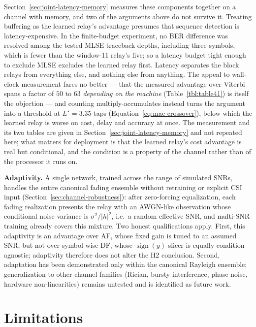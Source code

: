 Section~\ref{sec:joint-latency-memory} measures these components together on a channel with memory, and two of the arguments above do not survive it. Treating buffering as the learned relay's advantage presumes that sequence detection is latency-expensive. In the finite-budget experiment, no BER difference was resolved among the tested MLSE traceback depths, including three symbols, which is fewer than the window-11 relay's five; so a latency budget tight enough to exclude MLSE excludes the learned relay first. Latency separates the block relays from everything else, and nothing else from anything. The appeal to wall-clock measurement fares no better --- that the measured advantage over Viterbi spans a factor of $50$ to $63$ \emph{depending on the machine} (Table~\ref{tbl:table41}) is itself the objection --- and counting multiply-accumulates instead turns the argument into a threshold at $L^{\star}=3.35$ taps (Equation~\ref{eq:mac-crossover}), below which the learned relay is worse on cost, delay and accuracy at once. The measurement and its two tables are given in Section~\ref{sec:joint-latency-memory} and not repeated here; what matters for deployment is that the learned relay's cost advantage is real but conditional, and the condition is a property of the channel rather than of the processor it runs on.

\textbf{Adaptivity.} A single network, trained across the range of simulated SNRs, handles the entire canonical fading ensemble without retraining or explicit CSI input (Section~\ref{sec:channel-robustness}): after zero-forcing equalization, each fading realization presents the relay with an AWGN-like observation whose conditional noise variance is $\sigma^{2}/|h|^{2}$, i.e.\ a random effective SNR, and multi-SNR training already covers this mixture. Two honest qualifications apply. First, this adaptivity is an advantage over AF, whose fixed gain is tuned to an assumed SNR, but not over symbol-wise DF, whose $\operatorname{sign}(y)$ slicer is equally condition-agnostic; adaptivity therefore does not alter the H2 conclusion. Second, adaptation has been demonstrated only within the canonical Rayleigh ensemble; generalization to other channel families (Rician, bursty interference, phase noise, hardware non-linearities) remains untested and is identified as future work.

\section{Limitations}\label{sec:limitations}

